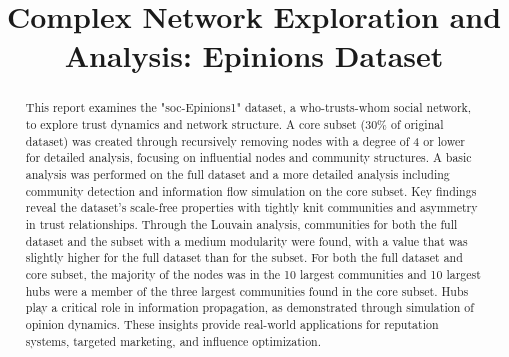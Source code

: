 \documentclass[conference]{IEEEtran}
\begin{document}
\title{Complex Network Exploration and Analysis: Epinions Dataset}

\author{
\and
{}
\and
{}
}

\maketitle

\begin{abstract}
This report examines the "soc-Epinions1" dataset, a who-trusts-whom social network, to explore trust dynamics and network structure. A core subset (30\% of original dataset) was created through recursively removing nodes with a degree of 4 or lower for detailed analysis, focusing on influential nodes and community structures. A basic analysis was performed on the full dataset and a more detailed analysis including community detection and information flow simulation on the core subset. Key findings reveal the dataset's scale-free properties with tightly knit communities and asymmetry in trust relationships. Through the Louvain analysis, communities for both the full dataset and the subset with a medium modularity were found, with a value that was slightly higher for the full dataset than for the subset. For both the full dataset and core subset, the majority of the nodes was in the 10 largest communities and 10 largest hubs were a member of the three largest communities found in the core subset. Hubs play a critical role in information propagation, as demonstrated through simulation of opinion dynamics. These insights provide real-world applications for reputation systems, targeted marketing, and influence optimization. 
\end{abstract}
\end{document}
